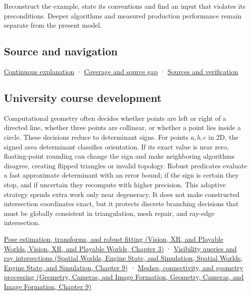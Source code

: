 Reconstruct the example, state its conventions and find an input that violates its preconditions. Deeper algorithms and measured production performance remain separate from the present model.

\subsection{Source and navigation}\label{appendix-da478be01d02-source-and-navigation}

\hyperref[01-foundations-i-ch018-keep-the-promises-visible-while-moving-between-representations]{Continuous explanation} · \hyperref[appendix-fd090d982a15-phase-7---parts-601-700]{Coverage and source gap} · \hyperref[appendix-a103e7846d21-phase-7---source-analysis-and-verification]{Sources and verification}

\subsection{University course development}\label{appendix-da478be01d02-university-course-development}

Computational geometry often decides whether points are left or right of a directed line, whether three points are collinear, or whether a point lies inside a circle. These decisions reduce to determinant signs. For points \(a,b,c\) in 2D, the signed area determinant classifies orientation. If its exact value is near zero, floating-point rounding can change the sign and make neighboring algorithms disagree, creating flipped triangles or invalid topology. Robust predicates evaluate a fast approximate determinant with an error bound; if the sign is certain they stop, and if uncertain they recompute with higher precision. This adaptive strategy spends extra work only near degeneracy. It does not make constructed intersection coordinates exact, but it protects discrete branching decisions that must be globally consistent in triangulation, mesh repair, and ray-edge intersection.

\href{../07-Vision-XR-and-Playable-Worlds/main.pdf\#nameddest=04-visual-computing-ii-ch032-pose-estimation-transforms-and-robust-fitting}{Pose estimation, transforms, and robust fitting (Vision, XR, and Playable Worlds, Vision, XR, and Playable Worlds, Chapter 3)} · \href{../05-Spatial-Worlds-Engine-State-and-Simulation/main.pdf\#nameddest=04-visual-computing-ii-ch028-visibility-queries-and-ray-intersections-1}{Visibility queries and ray intersections (Spatial Worlds, Engine State, and Simulation, Spatial Worlds, Engine State, and Simulation, Chapter 9)} · \href{../03-Geometry-Cameras-and-Image-Formation/main.pdf\#nameddest=03-visual-computing-i-ch002-meshes-connectivity-and-geometry-processing}{Meshes, connectivity, and geometry processing (Geometry, Cameras, and Image Formation, Geometry, Cameras, and Image Formation, Chapter 9)}
